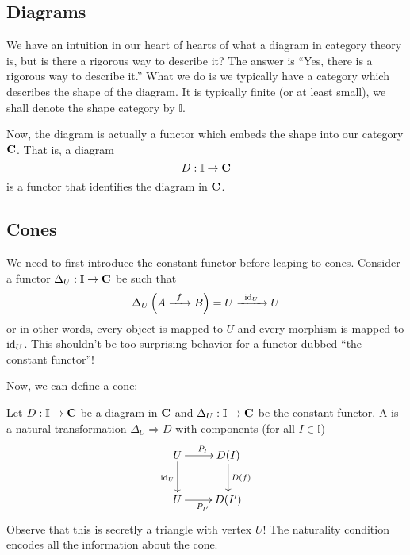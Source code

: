 
\subsection{Diagrams}

We have an intuition in our heart of hearts of what a diagram in
category theory is, but is there a rigorous way to describe it?
The answer is ``Yes, there is a rigorous way to describe it.''
What we do is we typically have a category which describes the
shape of the diagram. It is typically finite (or at least small),
we shall denote the shape category by $\mathbb{I}$.

Now, the diagram is actually a functor which embeds the shape
into our category $\mathbf{C}$. That is, a diagram
$$ D:\mathbb{I}\to\mathbf{C} $$
is a functor that identifies the diagram in $\mathbf{C}$.

\subsection{Cones}

We need to first introduce the constant functor before leaping to
cones. Consider a functor $\Delta_{U}:\mathbb{I}\to\mathbf{C}$ be
such that
\begin{equation}%
\Delta_{U}\left(A\xrightarrow{\;\;f\;\;}B\right) = U\xrightarrow{\;\;\id{U}\;\;}U
\end{equation}
or in other words, every object is mapped to $U$ and every
morphism is mapped to $\operatorname{id}_{U}$. This shouldn't be too surprising
behavior for a functor dubbed ``the constant functor''!

Now, we can define a cone:
\begin{defn}%
Let $D:\mathbb{I}\to\mathbf{C}$ be a diagram in $\mathbf{C}$ and
$\Delta_{U}:\mathbb{I}\to\mathbf{C}$ be the constant functor.
A  is a natural
transformation $\Delta_{U}\Rightarrow{D}$ with components (for
all $I\in\mathbb{I}$)
\begin{equation}\label{eq:coneNaturalityCondition}
\vcenter{\xymatrix{
U\ar[d]_{\id{U}}\ar[r]^{P_{I}}&D(I)\ar[d]^{D(f)}\\
U\ar[r]_{P_{I'}}&D(I')
}}
\end{equation}
Observe that this is secretly a triangle with vertex $U$! The
naturality condition encodes all the information about the cone.
\end{defn}

